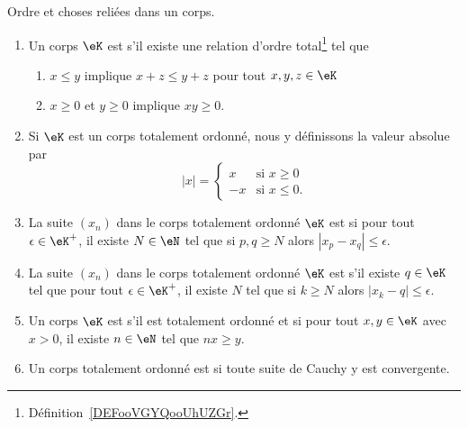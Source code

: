 \begin{definition}      \label{DefKCGBooLRNdJf}
    Ordre et choses reliées dans un corps.
    \begin{enumerate}
        \item \label{ITEMooOOOVooJWwIQr}
            Un corps \( \eK\) est  s'il existe une relation d'ordre total\footnote{Définition~\ref{DEFooVGYQooUhUZGr}.} tel que
            \begin{enumerate}
                \item
                    \( x\leq y\) implique \( x+z\leq y+z\) pour tout \( x,y,z\in \eK\)
                \item   \label{CONDooBYYDooElXgPO}
                    \( x\geq 0\) et \( y\geq 0\) implique \( xy\geq 0\).
            \end{enumerate}
        \item       \label{ItemooWUGSooRSRvYC}
            Si \( \eK\) est un corps totalement ordonné, nous y définissons la valeur absolue par
            \begin{equation}
                | x |=\begin{cases}
                    x    &   \text{si }x\geq 0\\
                    -x    &    \text{si } x\leq 0.
                \end{cases}
            \end{equation}
        \item       \label{ItemVXOZooTYpcYN}
    La suite \( (x_n)\) dans le corps totalement ordonné \( \eK\) est  si pour tout \( \epsilon\in \eK^+\), il existe \( N\in \eN\) tel que si \( p,q\geq N\) alors \( | x_p-x_q |\leq \epsilon\).
\item       \label{ITEMooDERQooLmJwFR}
    La suite \( (x_n)\) dans le corps totalement ordonné \( \eK\) est  s'il existe \( q\in \eK\) tel que pour tout \( \epsilon\in \eK^+\), il existe \( N\) tel que si \( k\geq N\) alors \( | x_k-q |\leq \epsilon\).
\item   \label{ItemooDZQKooPsqeRf}
            Un corps \( \eK\) est  s'il est totalement ordonné et si pour tout \( x,y\in \eK\) avec \( x>0\), il existe \( n\in \eN\) tel que \( nx\geq y\).
        \item       \label{ITEMooKZZYooDaidGU}
            Un corps totalement ordonné est  si toute suite de Cauchy y est convergente.

\end{enumerate}
\end{definition}
